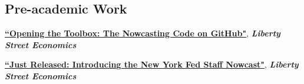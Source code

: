 \documentclass[margin,line]{res}                          %
\newenvironment{list1}{
	\begin{list}{\ding{113}}{%
			\setlength{\itemsep}{0in}
			\setlength{\parsep}{0in} \setlength{\parskip}{0in}
			\setlength{\topsep}{0in} \setlength{\partopsep}{0in}
			\setlength{\leftmargin}{0.17in}}}{\end{list}}
\begin{document}
\begin{resume}
	\section{\sc Pre-academic Work} 
	\begin{list1}
		\item[] \href{https://libertystreeteconomics.newyorkfed.org/2018/08/opening-the-toolbox-the-nowcasting-code-on-github/}{\textbf{``Opening the Toolbox: The Nowcasting Code on GitHub"}}, \textit{\textbf{Liberty Street Economics}}  \smallskip
		\item[] \href{https://libertystreeteconomics.newyorkfed.org/2016/04/just-released-introducing-the-frbny-nowcast/}{\textbf{``Just Released: Introducing the New York Fed Staff Nowcast"}}, \textit{\textbf{Liberty Street Economics}} \smallskip            
	\end{list1}
	
	
	
	
	
\end{resume}
\end{document}
